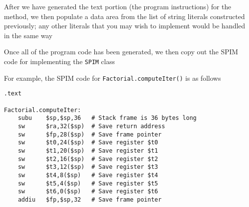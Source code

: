 \documentclass[8pt,a4paper,compress]{beamer}
\begin{document}
\begin{frame}[fragile]
\pause

After we have generated the text portion (the program instructions) for the method, we then populate
a data area from the list of string literals constructed previously; any other literals that you may wish to implement would be handled in the same way

\pause
\bigskip

Once all of the program code has been generated, we then copy out the SPIM code for implementing the \lstinline{SPIM} class

\pause
\bigskip

For example, the SPIM code for \lstinline{Factorial.computeIter()} is as follows
\begin{lstlisting}[language={},style=focusin]
.text

Factorial.computeIter:
    subu    $sp,$sp,36   # Stack frame is 36 bytes long
    sw      $ra,32($sp)  # Save return address
    sw      $fp,28($sp)  # Save frame pointer
    sw      $t0,24($sp)  # Save register $t0                                                                                                                                                                                                  
    sw      $t1,20($sp)  # Save register $t1
    sw      $t2,16($sp)  # Save register $t2                                                                                                                                                                                                  
    sw      $t3,12($sp)  # Save register $t3
    sw      $t4,8($sp)   # Save register $t4                                                                                                                                                                                                  
    sw      $t5,4($sp)   # Save register $t5
    sw      $t6,0($sp)   # Save register $t6                                                                                                                                                                                                  
    addiu   $fp,$sp,32   # Save frame pointer                                                                                                                                                                                                 
                                                                                                                                                                                                                                              

\end{lstlisting}
\end{frame}
\end{document}
